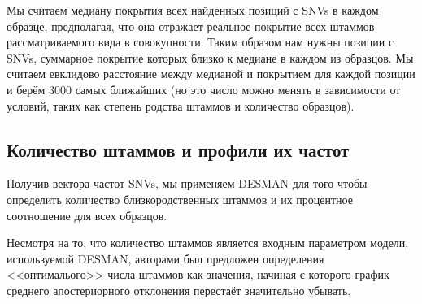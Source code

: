 \documentclass{spbau-diploma}
\begin{document}
Мы считаем медиану покрытия всех найденных позиций с SNVs в каждом образце, предполагая, что она отражает реальное покрытие всех штаммов рассматриваемого вида в совокупности. Таким образом нам нужны позиции с SNVs, суммарное покрытие которых близко к медиане в каждом из образцов. Мы считаем евклидово расстояние между медианой и покрытием для каждой позиции и берём 3000 самых ближайших (но это число можно менять в зависимости от условий, таких как степень родства штаммов и количество образцов).

\subsection{Количество штаммов и профили их частот}

Получив вектора частот SNVs, мы применяем DESMAN для того чтобы определить количество близкородственных штаммов и их процентное соотношение для всех образцов. 

Несмотря на то, что количество штаммов является входным параметром модели, используемой DESMAN, авторами был предложен определения <<оптималього>> числа штаммов как значения, начиная с которого график среднего апостериорного отклонения перестаёт значительно убывать. 
\end{document}
